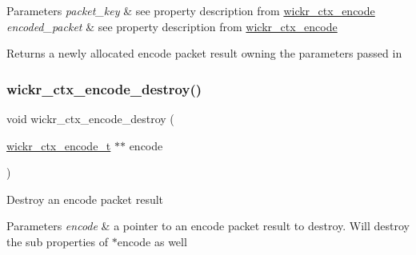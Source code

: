 \begin{DoxyParams}{Parameters}
{\em packet\+\_\+key} & see property description from \textquotesingle{}\mbox{\hyperlink{structwickr__ctx__encode}{wickr\+\_\+ctx\+\_\+encode}}\textquotesingle{} \\
\hline
{\em encoded\+\_\+packet} & see property description from \textquotesingle{}\mbox{\hyperlink{structwickr__ctx__encode}{wickr\+\_\+ctx\+\_\+encode}}\textquotesingle{} \\
\hline
\end{DoxyParams}
\begin{DoxyReturn}{Returns}
a newly allocated encode packet result owning the parameters passed in 
\end{DoxyReturn}
\mbox{\label{group__wickr__ctx_ga9ed3f7c0f4d672a2ac562b279e2da4e1}} 
\subsubsection{\texorpdfstring{wickr\+\_\+ctx\+\_\+encode\+\_\+destroy()}{wickr\_ctx\_encode\_destroy()}}
{\footnotesize\ttfamily void wickr\+\_\+ctx\+\_\+encode\+\_\+destroy (\begin{DoxyParamCaption}\item[{\mbox{\hyperlink{structwickr__ctx__encode}{wickr\+\_\+ctx\+\_\+encode\+\_\+t}} $\ast$$\ast$}]{encode }\end{DoxyParamCaption})}

Destroy an encode packet result


\begin{DoxyParams}{Parameters}
{\em encode} & a pointer to an encode packet result to destroy. Will destroy the sub properties of \textquotesingle{}$\ast$encode\textquotesingle{} as well \\
\hline
\end{DoxyParams}
\mbox{\label{group__wickr__ctx_ga3766720fd6654fad791a26cd2c1161b7}} 
